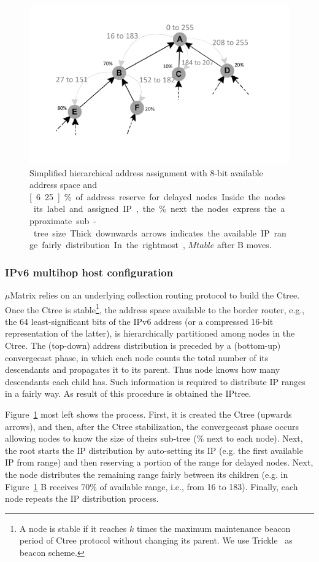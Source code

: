 \begin{figure}[t!]
\includegraphics[width=\linewidth]{img/hierarchical-address-assignment}
\caption{Simplified hierarchical address assignment
with 8-bit available address space and \unit[6.25]{\%} of address reserve for delayed nodes. Inside the nodes its label and assigned IP, the \% next the nodes express the approximate sub-tree size. Thick downwards arrows indicates the available IP range fairly distribution.  In the rightmost, $Mtable$ after B moves.}
\label{fig:hierarchical-addr-assigment}
\end{figure}

\subsubsection{IPv6 multihop host configuration}

$\mu$Matrix relies on an underlying collection routing protocol to build the Ctree. Once the Ctree is stable\footnote{A node is stable if it reaches $k$ times the maximum maintenance beacon period of Ctree protocol without changing its parent. We use Trickle~\cite{Levis:2004} as beacon scheme.}, the address space available to the border router, e.g., the 64 least-significant bits of the IPv6 address (or a compressed 16-bit representation of the latter), is hierarchically partitioned among nodes in the Ctree. The (top-down) address distribution is preceded by a (bottom-up) convergecast phase, in which each node counts the total number of its descendants and propagates it to its parent. Thus node knows how many descendants each child has. Such information is required to distribute IP ranges in a fairly way. As result of this procedure is obtained the IPtree.

Figure~\ref{fig:hierarchical-addr-assigment} most left shows the process. First, it is created the Ctree (upwards arrows), and then, after the Ctree stabilization, the convergecast phase occurs allowing nodes to know the size of theirs sub-tree (\% next to each node). Next, the root starts the IP distribution by auto-setting its IP (e.g. the first available IP from range) and then reserving a portion of the range for delayed nodes. Next, the node distributes the remaining range fairly between its children (e.g. in Figure~\ref{fig:hierarchical-addr-assigment} B receives 70\% of available range, i.e., from 16 to 183). Finally, each node repeats the IP distribution process.



